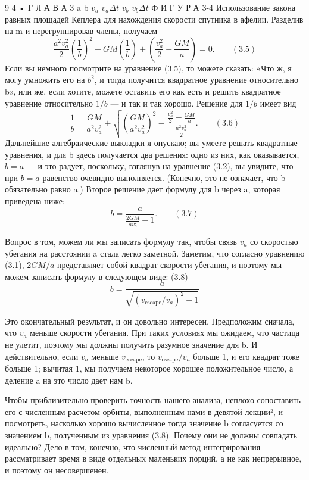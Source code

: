 \documentclass[10pt,oneside]{article}
\newcommand{\TipsRunning}[1]{\par\vspace{2bp}{\centering\footnotesize #1\par}\vspace{2bp}}
\begin{document}
9 4 • Г Л А В А  3 a b \(v_a\) \(v_a \Delta t\) \(v_b\) \(v_b \Delta t\) Ф И Г У Р А  3-4 Использование закона равных площадей Кеплера для нахождения скорости спутника в афелии. Разделив на m и перегруппировав члены, получаем \[\frac{a^2 v_a^2}{2} \left(\frac{1}{b}\right)^2 - GM \left(\frac{1}{b}\right) + \left(\frac{v_a^2}{2} - \frac{GM}{a}\right) = 0. \qquad (3.5)\] Если вы немного посмотрите на уравнение (3.5), то можете сказать: «Что ж, я могу умножить его на \(b^2\), и тогда получится квадратное уравнение относительно b», или же, если хотите, можете оставить его как есть и решить квадратное уравнение относительно \(1/b\) --- и так и так хорошо. Решение для \(1/b\) имеет вид \[\frac{1}{b} = \frac{GM}{a^2 v_a^2} \pm \sqrt{ \left(\frac{GM}{a^2 v_a^2}\right)^2 - \frac{\frac{v_a^2}{2} - \frac{GM}{a}}{\frac{a^2 v_a^2}{2}} }. \qquad (3.6)\] Дальнейшие алгебраические выкладки я опускаю; вы умеете решать квадратные уравнения, и для b здесь получается два решения: одно из них, как оказывается, \(b = a\) --- и это радует, поскольку, взглянув на уравнение (3.2), вы увидите, что при \(b = a\) равенство очевидно выполняется. (Конечно, это не означает, что b обязательно равно a.) Второе решение дает формулу для b через a, которая приведена ниже: \[b = \frac{a}{\frac{2GM}{a v_a^2} - 1}. \qquad (3.7)\]\par

\TipsRunning{З А Д А Ч И  И  И Х  Р Е Ш Е Н И Я • 9 5}

Вопрос в том, можем ли мы записать формулу так, чтобы связь \(v_a\) со скоростью убегания на расстоянии a стала легко заметной. Заметим, что согласно уравнению (3.1), \(2GM/a\) представляет собой квадрат скорости убегания, и поэтому мы можем записать формулу в следующем виде: (3.8) \[b = \frac{a}{\sqrt{(v_{\text{escape}}/v_a)^2 - 1}}\]\par

Это окончательный результат, и он довольно интересен. Предположим сначала, что \(v_a\) меньше скорости убегания. При таких условиях мы ожидаем, что частица не улетит, поэтому мы должны получить разумное значение для b. И действительно, если \(v_a\) меньше \(v_{\text{escape}}\), то \(v_{\text{escape}}/v_a\) больше 1, и его квадрат тоже больше 1; вычитая 1, мы получаем некоторое хорошее положительное число, а деление a на это число дает нам b.\par

Чтобы приблизительно проверить точность нашего анализа, неплохо сопоставить его с численным расчетом орбиты, выполненным нами в девятой лекции², и посмотреть, насколько хорошо вычисленное тогда значение b согласуется со значением b, полученным из уравнения (3.8). Почему они не должны совпадать идеально? Дело в том, конечно, что численный метод интегрирования рассматривает время в виде отдельных маленьких порций, а не как непрерывное, и поэтому он несовершенен.\par
\end{document}
